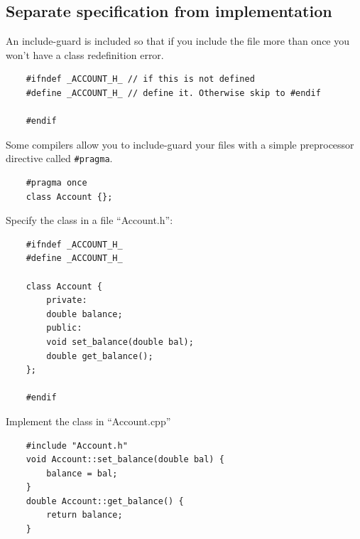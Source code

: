 \subsection{Separate specification from implementation}
An include-guard is included so that if you include the file more than once you won't have a class redefinition error.
\begin{verbatim}
    #ifndef _ACCOUNT_H_ // if this is not defined
    #define _ACCOUNT_H_ // define it. Otherwise skip to #endif

    #endif
\end{verbatim}
Some compilers allow you to include-guard your files with a simple preprocessor directive called \texttt{#pragma}.
\begin{verbatim}
    #pragma once 
    class Account {};

\end{verbatim}
Specify the class in a file ``Account.h'':
\begin{verbatim}
    #ifndef _ACCOUNT_H_
    #define _ACCOUNT_H_

    class Account {
        private:
        double balance;
        public:
        void set_balance(double bal);
        double get_balance();
    };

    #endif
\end{verbatim}
Implement the class in ``Account.cpp''
\begin{verbatim}
    #include "Account.h"
    void Account::set_balance(double bal) {
        balance = bal;
    }
    double Account::get_balance() {
        return balance;
    }
\end{verbatim}

